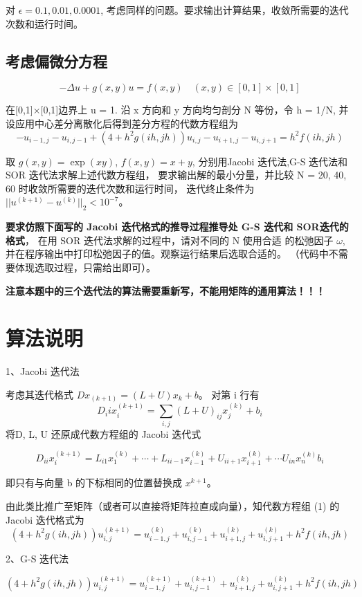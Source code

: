 \documentclass{article}
\begin{document}
对 $\epsilon = 0.1, 0.01, 0.0001$, 考虑同样的问题。要求输出计算结果，收敛所需要的迭代次数和运行时间。


\subsection{考虑偏微分方程}
\[
    -\Delta u+g(x,y)u=f(x,y) \quad(x,y)\in [0,1]×[0,1]
\]


在[0,1]×[0,1]边界上 u = 1. 沿 x 方向和 y 方向均匀剖分 N 等份，令 h = 1/N, 并设应用中心差分离散化后得到差分方程的代数方程组为
$$-u_{i-1,j}-u_{i,j-1}+(4 + h^2g(ih, jh))u_{i,j}-u_{i+1,j}-u_{i,j+1} = h^2f(ih, jh)$$

取 $g(x, y) = \exp(xy)$, $f(x, y) = x+y$, 分别用Jacobi 迭代法,G-S 迭代法和 SOR 迭代法求解上述代数方程组，
要求输出解的最小分量，并比较 N = 20, 40, 60 时收敛所需要的迭代次数和运行时间，
迭代终止条件为 $||u^{(k+1)}-u^{(k)}||_2 < 10^{-7}$。

\textbf{要求仿照下面写的 Jacobi 迭代格式的推导过程推导处 G-S 迭代和 SOR迭代的格式}，
在用 SOR 迭代法求解的过程中，请对不同的 N 使用合适
的松弛因子 $\omega$, 并在程序输出中打印松弛因子的值。观察运行结果后选取合适的。
（代码中不需要体现选取过程，只需给出即可）。

\textbf{注意本题中的三个迭代法的算法需要重新写，不能用矩阵的通用算法！！！}

\section{算法说明}

1、Jacobi 迭代法

考虑其迭代格式 $Dx_{(k+1)} = (L + U)x_k + b$。 对第 i 行有
\[
    D_iix_i^{(k+1)} =\sum_{i,j}(L + U)_{ij}x_j^{(k)} + b_i
\]
将D, L, U 还原成代数方程组的 Jacobi 迭代式

\[
    D_{ii}x_{i}^{(k+1)}= L_{i1}x^{(k)}_1 + \cdots + L_{ii-1}x^{(k)}_{i-1} + U_{ii+1}x^{(k)}_{i+1} +\cdots U_{in}x^{(k)}_n b_i
\]

即只有与向量 b 的下标相同的位置替换成 $x^{k+1}$。

由此类比推广至矩阵（或者可以直接将矩阵拉直成向量），知代数方程组 (1) 的 Jacobi 迭代格式为
\[
    (4 + h^2g(ih, jh))u_{i,j}^{(k+1)}=u_{i-1,j}^{(k)}+u_{i,j-1}^{(k)}+u_{i+1,j}^{(k)}+u_{i,j+1}^{(k)}+h^2f(ih, jh)
\]

2、G-S 迭代法

\[
    (4 + h^2g(ih, jh))u_{i,j}^{(k+1)} = u_{i-1,j}^{(k+1)} + u_{i,j-1}^{(k+1)} + u_{i+1,j}^{(k)}+u_{i,j+1}^{(k)}+h^2f(ih, jh)
\]
\end{document}
